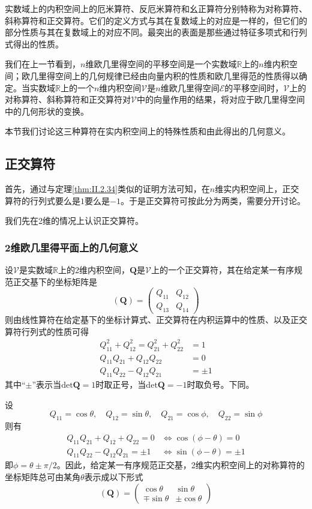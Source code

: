 \documentclass[main.tex]{subfiles}
\begin{document}
实数域上的内积空间上的厄米算符、反厄米算符和幺正算符分别特称为对称算符、斜称算符和正交算符。它们的定义方式与其在复数域上的对应是一样的，但它们的部分性质与其在复数域上的对应不同。最突出的表面是那些通过特征多项式和行列式得出的性质。

我们在上一节看到，$n$维欧几里得空间的平移空间是一个实数域$\mathbb{R}$上的$n$维内积空间；欧几里得空间上的几何规律已经由向量内积的性质和欧几里得范的性质得以确定。当实数域$\mathbb{R}$上的一个$n$维内积空间$\mathcal{V}$是$n$维欧几里得空间$\mathcal{E}$的平移空间时，$\mathcal{V}$上的对称算符、斜称算符和正交算符对$\mathcal{V}$中的向量作用的结果，将对应于欧几里得空间中的几何形状的变换。

本节我们讨论这三种算符在实内积空间上的特殊性质和由此得出的几何意义。

\subsection{正交算符}
首先，通过与定理\ref{thm:II.2.34}类似的证明方法可知，在$n$维实内积空间上，正交算符的行列式要么是$1$要么是$-1$。于是正交算符可按此分为两类，需要分开讨论。

我们先在2维的情况上认识正交算符。

\subsubsection{2维欧几里得平面上的几何意义}
设$\mathcal{V}$是实数域$\mathbb{R}$上的2维内积空间，$\mathbf{Q}$是$\mathcal{V}$上的一个正交算符，其在给定某一有序规范正交基下的坐标矩阵是
\[\left(\mathbf{Q}\right)=\left(\begin{array}{cc}Q_{11}&Q_{12}\\Q_{13}&Q_{14}\end{array}\right)\]
则由线性算符在给定基下的坐标计算式、正交算符在内积运算中的性质、以及正交算符行列式的性质可得
\begin{align*}
    Q_{11}^2+Q_{12}^2=Q_{21}^2+Q_{22}^2 & =1     \\
    Q_{11}Q_{21}+Q_{12}Q_{22}           & =0     \\
    Q_{11}Q_{22}-Q_{12}Q_{21}           & =\pm 1
\end{align*}
其中“$\pm$”表示当$\mathrm{det}\mathbf{Q}=1$时取正号，当$\mathrm{det}\mathbf{Q}=-1$时取负号。下同。

设
\[Q_{11}=\cos\theta,\quad Q_{12}=\sin\theta,\quad Q_{21}=\cos\phi,\quad Q_{22}=\sin\phi\]
则有
\begin{align*}
    Q_{11}Q_{21}+Q_{12}+Q_{22}  =0    & \Leftrightarrow\cos\left(\phi-\theta\right)=0     \\
    Q_{11}Q_{22}-Q_{12}Q_{21}  =\pm 1 & \Leftrightarrow\sin\left(\phi-\theta\right)=\pm 1
\end{align*}
即$\phi=\theta\pm\pi/2$。因此，给定某一有序规范正交基，2维实内积空间上的对称算符的坐标矩阵总可由某角$\theta$表示成以下形式
\[\left(\mathbf{Q}\right)=\left(\begin{array}{cc}\cos\theta&\sin\theta\\\mp\sin\theta&\pm\cos\theta\end{array}\right)\]
\end{document}

